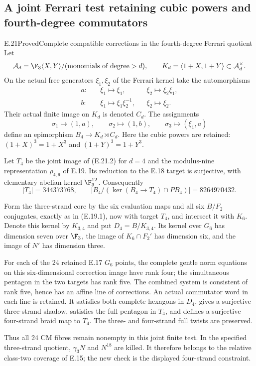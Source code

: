 \subsection{A joint Ferrari test retaining cubic powers and fourth-degree commutators}

\begin{statement}{E.21}{Proved}{Complete compatible corrections in the fourth-degree Ferrari quotient}
Let
\[
 \mathcal A_d=\F_3\langle X,Y\rangle/(\text{monomials of degree}>d),
 \qquad
 K_d=\langle1+X,1+Y\rangle\subset\mathcal A_d^\times.
\]
On the actual free generators $\xi_1,\xi_2$ of the
Ferrari kernel take the automorphisms
\[
 \begin{aligned}
 a:&\quad\xi_1\mapsto\xi_1,
           &&\xi_2\mapsto\xi_2\xi_1,\\
 b:&\quad\xi_1\mapsto\xi_1\xi_2^{-1},
           &&\xi_2\mapsto\xi_2.
 \end{aligned}
 \tag{E.21.1}
\]
Their actual finite image on $K_d$ is denoted $C_d$.
The assignments
\[
 \sigma_1\mapsto(1,a),\qquad
 \sigma_2\mapsto(1,b),\qquad
 \sigma_3\mapsto(\xi_1,a)
 \tag{E.21.2}
\]
define an epimorphism $B_4\to K_d\rtimes C_d$.
Here the cubic powers are retained:
$(1+X)^3=1+X^3$ and $(1+Y)^3=1+Y^3$.

Let $T_4$ be the joint image of (E.21.2) for $d=4$
and the modulus-nine representation $\rho_{4,9}$
of E.19. Its reduction to the E.18 target is
surjective, with elementary abelian kernel
$\F_3^{12}$. Consequently
\[
 |T_4|=344373768,
 \qquad
 |B_4/(\ker(B_4\to T_4)\cap PB_4)|=8264970432.
 \tag{E.21.3}
\]

Form the three-strand core by the six evaluation
maps and all six $B/F_2$ conjugates, exactly as
in (E.19.1), now with target $T_4$, and intersect
it with $K_6$. Denote this kernel by $K_{3,4}$
and put $D_4=B/K_{3,4}$. Its kernel over $G_6$
has dimension seven over $\F_3$, the image of
$K_6\cap F_2'$ has dimension six, and the image
of $N'$ has dimension three.

For each of the 24 retained E.17 $G_6$ points,
the complete gentle norm equations on this
six-dimensional correction image have rank
four; the simultaneous pentagon in the two
targets has rank five. The combined system
is consistent of rank five, hence has an
affine line of corrections. An actual
commutator word in each line is retained.
It satisfies both complete hexagons in
$D_4$, gives a surjective three-strand
shadow, satisfies the full pentagon in
$T_4$, and defines a surjective four-strand
braid map to $T_4$. The three- and
four-strand full twists are preserved.

Thus all 24 CM fibres remain nonempty in
this joint finite test. In the specified
three-strand quotient, $\gamma_3N$ and
$N^{18}$ are killed. It therefore belongs
to the relative class-two coverage of
E.15; the new check is the displayed
four-strand constraint.
\end{statement}
